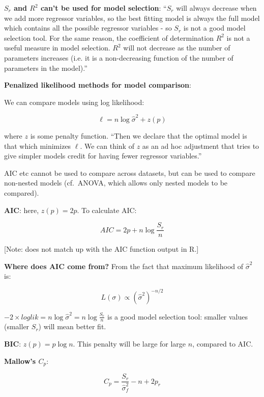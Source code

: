 \textbf{$S_r$ and $R^2$ can't be used for model selection}:
``$S_r$ will always decrease when we add more regressor variables, so the best fitting model is always the full model which contains all the possible regressor variables - so $S_r$ is not a good model selection tool. For the same reason, the coefficient of determination $R^2$ is not a useful measure in model selection. $R^2$ will not decrease as the number of parameters increases (i.e. it is a non-decreasing function of the number of parameters in the model).''

\textbf{Penalized likelihood methods for model comparison}:

We can compare models using log likelihood: 

\begin{equation}
\ell = n \log \hat{\sigma}^2 + z(p)
\end{equation}

\noindent
where $z$ is some penalty function. ``Then we declare that the optimal model is that which minimizes $\ell$. We can think of $z$ as an ad hoc adjustment that tries to give simpler models credit for having fewer regressor variables.''

AIC etc cannot be used to compare across datasets, but can be used to compare non-nested models (cf.\ ANOVA, which allows only nested models to be compared).

\textbf{AIC}: here, $z(p)= 2p$. To calculate AIC:

\begin{equation}
AIC = 2p + n\log \frac{S_r}{n}
\end{equation}

[Note: does not match up with the AIC function output in R.]

\textbf{Where does AIC come from?} From the fact that maximum likelihood of $\hat{\sigma}^2$ is:

\begin{equation}
  L(\sigma) \propto  (\hat{\sigma}^2)^{-n/2}
\end{equation}

$-2\times loglik=n\log \hat{\sigma}^2=n\log \frac{S_r}{n}$ is a good model selection tool: smaller values (smaller $S_r$) will mean better fit.

\textbf{BIC}:  $z(p)= p\log n$. This penalty will be large for large $n$, compared to AIC. 

\textbf{Mallow's $C_p$}: 

\begin{equation}
C_p = \frac{S_r}{\hat{\sigma}_f^2} - n + 2p_r
\end{equation}

